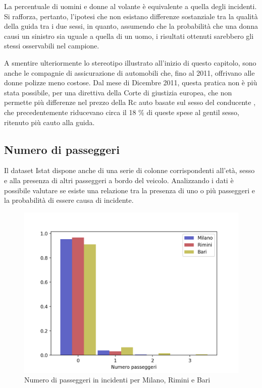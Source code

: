 \documentclass[a4paper,12pt]{report}
\begin{document}
La percentuale di uomini e donne al volante è equivalente a quella degli incidenti. 
Si rafforza, pertanto, l'ipotesi che non esistano differenze sostanziale tra la qualità 
della guida tra i due sessi, in quanto, assumendo che la probabilità che una donna causi un 
sinistro sia uguale a quella di un uomo, i risultati ottenuti sarebbero 
gli stessi osservabili nel campione. 

A smentire ulteriormente lo stereotipo illustrato all'inizio di questo capitolo, sono 
anche le compagnie di assicurazione di automobili che, fino al 2011, offrivano 
alle donne polizze meno costose. 
Dal mese di Dicembre 2011, questa pratica non è più stata possibile, per una direttiva della 
Corte di giustizia europea, che non permette più differenze nel prezzo della Rc auto basate 
sul sesso del conducente \cite{CORRIERE:1}, che precedentemente riducevano circa il 
18 \% di queste spese al gentil sesso, ritenuto più cauto alla guida. 

\subsection{Numero di passeggeri}

Il dataset Istat dispone anche di una serie di colonne corrispondenti all'età, sesso 
e alla presenza di altri passeggeri a bordo del veicolo.
Analizzando i dati è possibile valutare se esiste una 
relazione tra la presenza di uno o più passeggeri e la probabilità 
di essere causa di incidente.

\begin{figure}
    \includegraphics[width=\linewidth]{../src/incidenti/incidenti_senza_coords/passeggeri/passeggeri.png}
    \caption{Numero di passeggeri in incidenti per Milano, Rimini e Bari}
    \label{fig:passeggeri-milano-rimini}
\end{figure}
\end{document}
